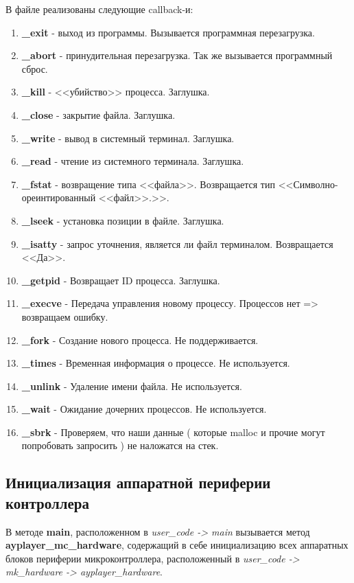 \documentclass[a4paper, 12pt]{article}
\begin{document}
В файле реализованы следующие callback-и:
\begin{enumerate}
	\item \textbf{\_exit} - выход из программы. Вызывается программная перезагрузка.
	\item \textbf{\_abort} - принудительная перезагрузка. Так же вызывается программный сброс.
	\item \textbf{\_kill} - <<убийство>> процесса. Заглушка.
	\item \textbf{\_close} - закрытие файла. Заглушка.
	\item \textbf{\_write} - вывод в системный терминал. Заглушка.
	\item \textbf{\_read} - чтение из системного терминала. Заглушка.
	\item \textbf{\_fstat} - возвращение типа <<файла>>. Возвращается тип <<Символно-ореинтированный <<файл>>.>>.
	\item \textbf{\_lseek} - установка позиции в файле. Заглушка.
	\item \textbf{\_isatty} - запрос уточнения, является ли файл терминалом. Возвращается <<Да>>.
	\item \textbf{\_getpid} - Возвращает ID процесса. Заглушка.
	\item \textbf{\_execve} - Передача управления новому процессу. Процессов нет => возвращаем ошибку.
	\item \textbf{\_fork} - Создание нового процесса. Не поддерживается.
	\item \textbf{\_times} - Временная информация о процессе. Не используется.
	\item \textbf{\_unlink} - Удаление имени файла. Не используется.
	\item \textbf{\_wait} - Ожидание дочерних процессов. Не используется.
	\item \textbf{\_sbrk} - Проверяем, что наши данные ( которые malloc и прочие могут попробовать запросить ) не наложатся на стек.
\end{enumerate}

\subsection{Инициализация аппаратной периферии контроллера}
В методе \textbf{main}, расположенном в \textit{user\_\-code -> main} вызывается метод \textbf{ayplayer\_\-mc\_\-hardware}, содержащий в себе инициализацию всех аппаратных блоков периферии микроконтроллера, расположенный в \textit{user\_\-code -> mk\_\-hardware -> ayplayer\_\-hardware}. 
\end{document}
